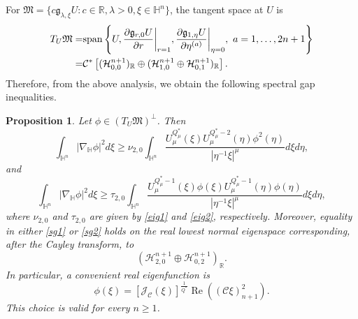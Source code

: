 \documentclass[11pt]{article}
\newtheorem{proposition}{Proposition}[section]
\begin{document}
{For $\mathfrak{M}=\{c\mathfrak{g}_{\lambda,\xi}U:c\in\mathbb{R},\lambda>0,\xi\in\mathbb{H}^{n}\}$, the tangent space at $U$ is}
\begin{align*}
 T_U \mathfrak{M}=&{\rm span}\left\{U, \frac{\partial \mathfrak{g}_{r,0}U}{\partial r}\bigg|_{r=1},\frac{\partial \mathfrak{g}_{1,\eta}U}{\partial \eta^{(a)}}\bigg|_{\eta=0},~a=1,\ldots,2n+1\right\}\\
 =&\mathcal C^*\left[(\mathcal H_{0,0}^{n+1})_{\mathbb R}
 \oplus(\mathcal H_{1,0}^{n+1}\oplus\mathcal H_{0,1}^{n+1})_{\mathbb R}\right].
\end{align*}
Therefore, from the above analysis, we obtain the following spectral gap inequalities.
\begin{proposition}\label{sg}
{Let $\phi\in(T_U\mathfrak{M})^\perp$. Then}
\begin{equation}\label{sg1}
 \int_{\mathbb{H}^{n}}|\nabla_\mathbb{H} \phi|^2 d\xi\geq \nu_{2,0}\int_{\mathbb{H}^{n}}\frac{U_\mu
^{Q^{\ast}_{\mu}}(\xi)U_\mu^{Q^{\ast}_{\mu}-2}(\eta)\phi^2(\eta)}{|\eta^{-1}\xi|^{\mu}}{d}\xi d\eta,
\end{equation}
and
\begin{equation}\label{sg2}
 \int_{\mathbb{H}^{n}}|\nabla_\mathbb{H} \phi|^2 d\xi\geq \tau_{2,0}\int_{\mathbb{H}^{n}}\frac{U_\mu
^{Q^{\ast}_{\mu}-1}(\xi)\phi(\xi) U_\mu^{Q^{\ast}_{\mu}-1}(\eta)\phi(\eta)}{|\eta^{-1}\xi|^{\mu}}{d}\xi d\eta,
\end{equation}
{where $\nu_{2,0}$ and $\tau_{2,0}$ are given by \eqref{eig1} and \eqref{eig2}, respectively.} {Moreover, equality in either \eqref{sg1} or \eqref{sg2} holds on the real lowest normal eigenspace corresponding, after the Cayley transform, to
\[
(\mathcal H_{2,0}^{n+1}\oplus\mathcal H_{0,2}^{n+1})_{\mathbb R}.
\]
In particular, a convenient real eigenfunction is
\begin{equation*}
\phi(\xi)=[\mathcal J_{\mathcal C}(\xi)]^{\frac{1}{Q^{\ast}}}\operatorname{Re}\!\left((\mathcal C\xi)_{n+1}^{2}\right).
\end{equation*}
This choice is valid for every $n\ge1$.}
\end{proposition}
\end{document}
